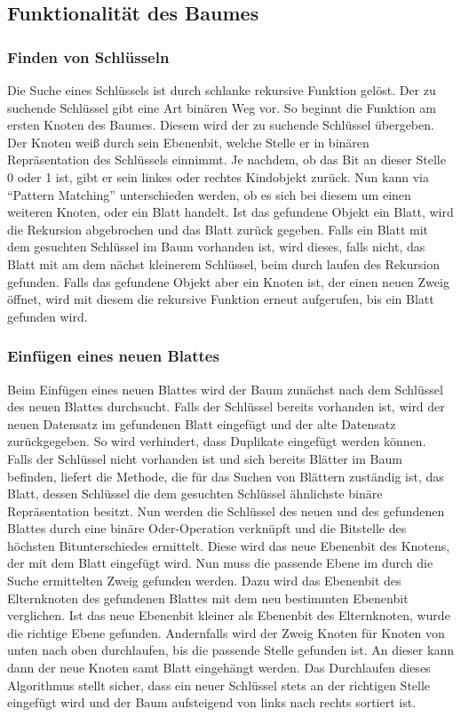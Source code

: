 \documentclass[a4paper,11pt,oneside,%
headsepline,												%
footsepline,												%
bibtotocnumbered									%
]{scrreprt}
\begin{document}
\subsection{Funktionalität des Baumes}
\subsubsection{Finden von Schlüsseln}
\label{sssec:FindKey}
Die Suche eines Schlüssels ist durch schlanke rekursive Funktion gelöst. Der zu suchende Schlüssel gibt eine Art binären Weg vor. So beginnt die Funktion am ersten Knoten des Baumes. Diesem wird der zu suchende Schlüssel übergeben. Der Knoten weiß durch sein Ebenenbit, welche Stelle er in binären Repräsentation des Schlüssels einnimmt. Je nachdem, ob das Bit an dieser Stelle 0 oder 1 ist, gibt er sein linkes oder rechtes Kindobjekt zurück. Nun kann via \enquote{Pattern Matching} unterschieden werden, ob es sich bei diesem um einen weiteren Knoten, oder ein Blatt handelt. Ist das gefundene Objekt ein Blatt, wird die Rekursion abgebrochen und das Blatt zurück gegeben. Falls ein Blatt mit dem gesuchten Schlüssel im Baum vorhanden ist, wird dieses, falls nicht, das Blatt mit am dem nächst kleinerem Schlüssel, beim durch laufen des Rekursion gefunden. Falls das gefundene Objekt aber ein Knoten ist, der einen neuen Zweig öffnet, wird mit diesem die rekursive Funktion erneut aufgerufen, bis ein Blatt gefunden wird.
\subsubsection{Einfügen eines neuen Blattes}
Beim Einfügen eines neuen Blattes wird der Baum zunächst nach dem Schlüssel des neuen Blattes durchsucht. Falls der Schlüssel bereits vorhanden ist, wird der neuen Datensatz im gefundenen Blatt eingefügt und der alte Datensatz zurückgegeben. So wird verhindert, dass Duplikate eingefügt werden können. Falls der Schlüssel nicht vorhanden ist und sich bereits Blätter im Baum befinden, liefert die Methode, die für das Suchen von Blättern zuständig ist, das Blatt, dessen Schlüssel die dem gesuchten Schlüssel ähnlichste binäre Repräsentation besitzt. Nun werden die Schlüssel des neuen und des gefundenen Blattes durch eine binäre Oder-Operation verknüpft und die Bitstelle des höchsten Bitunterschiedes ermittelt. Diese wird das neue Ebenenbit des Knotens, der mit dem Blatt eingefügt wird. Nun muss die passende Ebene im durch die Suche ermittelten Zweig gefunden werden. Dazu wird das Ebenenbit des Elternknoten des gefundenen Blattes mit dem neu bestimmten Ebenenbit verglichen. Ist das neue Ebenenbit kleiner als Ebenenbit des Elternknoten, wurde die richtige Ebene gefunden. Andernfalls wird der Zweig Knoten für Knoten von unten nach oben durchlaufen, bis die passende Stelle gefunden ist. An dieser kann dann der neue Knoten samt Blatt eingehängt werden. Das Durchlaufen dieses Algorithmus stellt sicher, dass ein neuer Schlüssel stets an der richtigen Stelle eingefügt wird und der Baum aufsteigend von links nach rechts sortiert ist.
\end{document}
